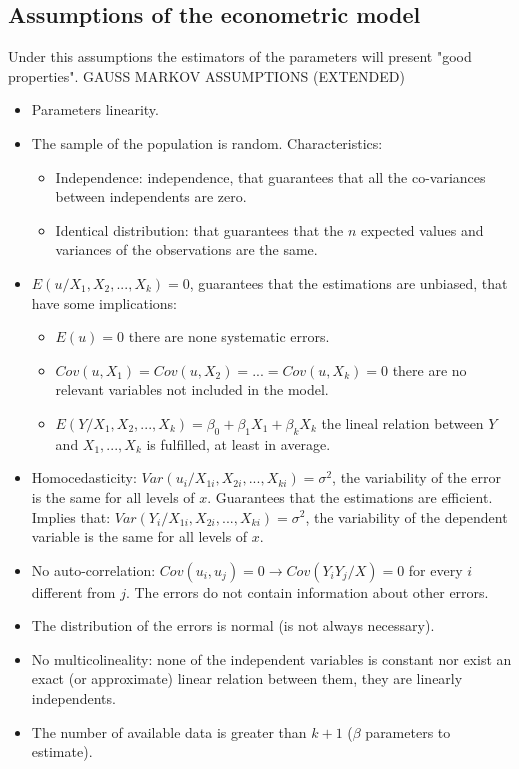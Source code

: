\documentclass[10pt,landscape]{article}
\begin{document}
\begin{multicols}{3}
\subsection*{Assumptions of the econometric model}
Under this assumptions the estimators of the parameters will present "good properties". GAUSS MARKOV ASSUMPTIONS (EXTENDED)
\begin{itemize}
\item Parameters linearity.
\item The sample of the population is random. Characteristics:
\begin{itemize}
\item Independence: independence, that guarantees that all the co-variances between independents are zero.
\item Identical distribution: that guarantees that the $n$ expected values and variances of the observations are the same.
\end{itemize}
\item $E(u / X_1, X_2, ..., X_k) = 0$, guarantees that the estimations are unbiased, that have some implications:
\begin{itemize}
\item $E(u) = 0$ there are none systematic errors.
\item $Cov(u, X_1) = Cov(u, X_2) = ... = Cov(u, X_k) = 0$ there are no relevant variables not included in the model.
\item $E(Y/X_1, X_2, ..., X_k) = \beta_0 + \beta_1 X_1 + \beta_k X_k$ the lineal relation between $Y$ and $X_1, ..., X_k$ is fulfilled, at least in average.
\end{itemize}
\item Homocedasticity: $Var(u_i / X_{1i}, X_{2i}, ..., X_{ki}) = \sigma^2$, the variability of the error is the same for all levels of $x$. Guarantees that the estimations are efficient. Implies that: $Var(Y_i / X_{1i}, X_{2i}, ..., X_{ki}) = \sigma^2$, the variability of the dependent variable is the same for all levels of $x$.
\item No auto-correlation: $Cov(u_i, u_j) = 0 \rightarrow Cov(Y_i Y_j / X) = 0$ for every $i$ different from $j$. The errors do not contain information about other errors.
\item The distribution of the errors is normal (is not always necessary).
\item No multicolineality: none of the independent variables is constant nor exist an exact (or approximate) linear relation between them, they are linearly independents.
\item The number of available data is greater than $k+1$ ($\beta$ parameters to estimate).
\end{itemize}


\end{multicols}
\end{document}
